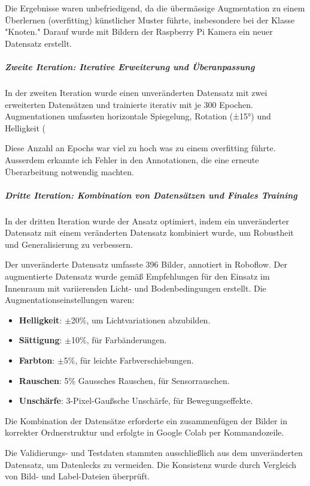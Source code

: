 Die Ergebnisse waren unbefriedigend, da die übermässige Augmentation zu einem Überlernen (overfitting) künstlicher Muster führte, insbesondere bei der Klasse "Knoten." Darauf wurde mit Bildern der Raspberry Pi Kamera ein neuer Datensatz erstellt.


\subparagraph{Zweite Iteration: Iterative Erweiterung und Überanpassung}

In der zweiten Iteration wurde einen unveränderten Datensatz mit zwei erweiterten Datensätzen und trainierte iterativ mit je 300 Epochen.
Augmentationen umfassten horizontale Spiegelung, Rotation (±15°) und Helligkeit (

Diese Anzahl an Epochs war viel zu hoch was zu einem overfitting führte. Ausserdem erkannte ich Fehler in den Annotationen, die eine erneute Überarbeitung notwendig machten.

\subparagraph{Dritte Iteration: Kombination von Datensätzen und Finales Training}

In der dritten Iteration wurde der Ansatz optimiert, indem ein unveränderter Datensatz mit einem veränderten Datensatz kombiniert wurde, um Robustheit und Generalisierung zu verbessern.

Der unveränderte Datensatz umfasste 396 Bilder, annotiert in Roboflow. Der augmentierte Datensatz wurde gemäß Empfehlungen für den Einsatz im Innenraum mit variierenden Licht- und Bodenbedingungen erstellt. Die Augmentationseinstellungen waren:

\begin{itemize} 
    \item \textbf{Helligkeit}: $\pm$20\%, um Lichtvariationen abzubilden. 
    \item \textbf{Sättigung}: $\pm$10\%, für Farbänderungen. 
    \item \textbf{Farbton}: $\pm$5\%, für leichte Farbverschiebungen. 
    \item \textbf{Rauschen}: 5\% Gaussches Rauschen, für Sensorrauschen. 
    \item \textbf{Unschärfe}: 3-Pixel-Gaußsche Unschärfe, für Bewegungseffekte. 
\end{itemize}
Die Kombination der Datensätze erforderte ein zusammenfügen der Bilder in korrekter Ordnerstruktur und erfolgte in Google Colab per Kommandozeile.

Die Validierungs- und Testdaten stammten ausschließlich aus dem unveränderten Datensatz, um Datenlecks zu vermeiden. Die Konsistenz wurde durch Vergleich von Bild- und Label-Dateien überprüft.

